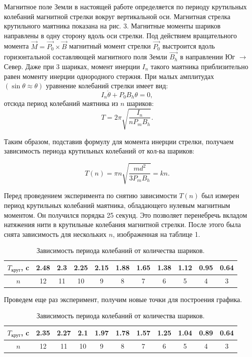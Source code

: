 \documentclass[a4paper, 14pt]{extarticle}%
\newcommand\ECaption[1]{%
     \captionsetup{font=footnotesize}%
     \caption{#1}}
\newcommand\ECaption[1]{%
     \captionsetup{font=footnotesize}%
     \caption{#1}}
\begin{document}
Магнитное поле Земли в настоящей работе определяется по периоду крутильных колебаний
магнитной стрелки вокруг вертикальной оси. 
Магнитная стрелка крутильного маятника показана на рис. 3.
 Магнитные моменты шариков направлены в одну
сторону вдоль оси стрелки. Под действием вращательного
момента $\vec{M} = \vec{P_0} \times\vec{B}$ магнитный момент стрелки $\vec{P_0}$ выстроится вдоль горизонтальной составляющей магнитного поля Земли $\vec{B_h}$ в направлении Юг $\longrightarrow$ Север. 
Даже при 3 шариках, момент инерции $I_n$ такого маятника приблизительно равен моменту инерции однородного стержня. При малых амплитудах $(\sin\theta\approx\theta)$ уравнение колебаний стрелки имеет вид:
\[I_n\ddot{\theta} + P_0B_h\theta=0,\]
отсюда период колебаний маятника из $n$ шариков:
\[T = 2\pi\sqrt{\frac{I_n}{nP_mB_h}}.\]

Таким образом, подставив формулу для момента инерции стрелки, получаем  зависимость периода крутильных колебаний от кол-ва шариков:

\begin{equation}
T(n) = \pi n\sqrt{\frac{md^2}{3P_mB_h}} = kn.
\end{equation}

Перед проведением эксперимента по снятию зависимости $T(n)$ был измерен период крутильных колебаний маятника, обладающего нулевым магнитным моментом. Он получился порядка 25 секунд. Это позволяет перенебречь вкладом натяжения нити в крутильные колебания магнитной стрелки. После этого была снята зависимость для нескольких $n$, изображенная на таблице 1.
\begin{table}[h!]
\begin{center}
\begin{tabular}{|c|c|c|c|c|c|c|c|c|c|c|}
\hline
\rowcolor[HTML]{9698ED} 
$T_{\text{крут}}$, c & 2.48 &  2.3 & 2.25 & 2.15 & 1.88 & 1.65 & 1.38 & 1.12 & 0.95 & 0.64 \\ \hline
$n$                  & 12   & 11   & 10    & 9   & 8    & 7    & 6    & 5    & 4    & 3    \\ \hline
\end{tabular}
\ECaption{Зависимость периода колебаний от количества шариков.}
\end{center}
\end{table}

Проведем еще раз эксперимент, получим новые точки для построения графика.

\begin{table}[h!]
\begin{center}
\begin{tabular}{|c|c|c|c|c|c|c|c|c|c|c|}
\hline
\rowcolor[HTML]{9698ED} 
$T_{\text{крут}}$, c & 2.35 &  2.27 & 2.1 & 1.97 & 1.78 & 1.57 & 1.25 & 1.04 & 0.89 & 0.64 \\ \hline
$n$                  & 12   & 11   & 10    & 9   & 8    & 7    & 6    & 5    & 4    & 3    \\ \hline
\end{tabular}
\ECaption{Зависимость периода колебаний от количества шариков.}
\end{center}
\end{table}
\end{document}
